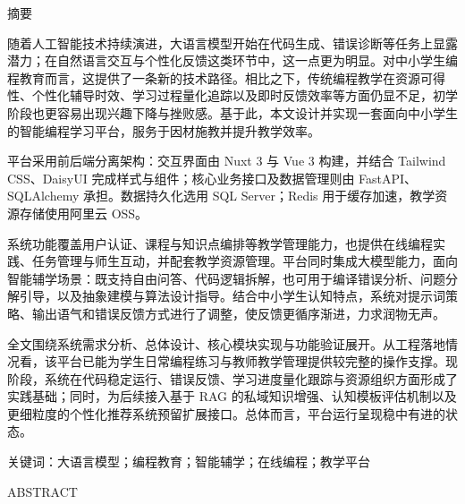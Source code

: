 \cleardoublepage
\vspace*{2\baselineskip}
{\centering{}\hei{} 摘要\par}
\vspace{2\baselineskip}

{\song{}\setlength{\baselineskip}{20pt}
随着人工智能技术持续演进，大语言模型开始在代码生成、错误诊断等任务上显露潜力；在自然语言交互与个性化反馈这类环节中，这一点更为明显。对中小学生编程教育而言，这提供了一条新的技术路径。相比之下，传统编程教学在资源可得性、个性化辅导时效、学习过程量化追踪以及即时反馈效率等方面仍显不足，初学阶段也更容易出现兴趣下降与挫败感。基于此，本文设计并实现一套面向中小学生的智能编程学习平台，服务于因材施教并提升教学效率。

平台采用前后端分离架构：交互界面由 Nuxt 3 与 Vue 3 构建，并结合 Tailwind CSS、DaisyUI 完成样式与组件；核心业务接口及数据管理则由 FastAPI、SQLAlchemy 承担。数据持久化选用 SQL Server；Redis 用于缓存加速，教学资源存储使用阿里云 OSS。

系统功能覆盖用户认证、课程与知识点编排等教学管理能力，也提供在线编程实践、任务管理与师生互动，并配套教学资源管理。平台同时集成大模型能力，面向智能辅学场景：既支持自由问答、代码逻辑拆解，也可用于编译错误分析、问题分解引导，以及抽象建模与算法设计指导。结合中小学生认知特点，系统对提示词策略、输出语气和错误反馈方式进行了调整，使反馈更循序渐进，力求润物无声。

全文围绕系统需求分析、总体设计、核心模块实现与功能验证展开。从工程落地情况看，该平台已能为学生日常编程练习与教师教学管理提供较完整的操作支撑。现阶段，系统在代码稳定运行、错误反馈、学习进度量化跟踪与资源组织方面形成了实践基础；同时，为后续接入基于 RAG 的私域知识增强、认知模板评估机制以及更细粒度的个性化推荐系统预留扩展接口。总体而言，平台运行呈现稳中有进的状态。

\vspace{20pt}
\noindent\hei{} 关键词\song{}：大语言模型；编程教育；智能辅学；在线编程；教学平台
}

\cleardoublepage
\vspace*{2\baselineskip}
{\centering{}\hei{} ABSTRACT\par}
\vspace{2\baselineskip}

